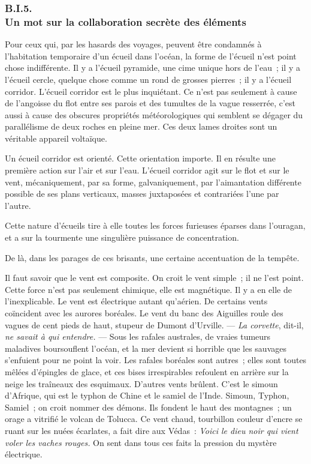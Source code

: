 \documentclass[french,twoside]{book} %
\begin{document}
 \subsubsection[{B.I.5. Un mot sur la collaboration secrète des éléments}]{B.I.5. \\
Un mot sur la collaboration secrète des éléments}
\noindent Pour ceux qui, par les hasards des voyages, peuvent être condamnés à l’habitation temporaire d’un écueil dans l’océan, la forme de l’écueil n’est point chose indifférente. Il y a l’écueil pyramide, une cime unique hors de l’eau ; il y a l’écueil cercle, quelque chose comme un rond de grosses pierres ; il y a l’écueil corridor. L’écueil corridor est le plus inquiétant. Ce n’est pas seulement à cause de l’angoisse du flot entre ses parois et des tumultes de la vague resserrée, c’est aussi à cause des obscures propriétés météorologiques qui semblent se dégager du parallélisme de deux roches en pleine mer. Ces deux lames droites sont un véritable appareil voltaïque.\par
Un écueil corridor est orienté. Cette orientation importe. Il en résulte une première action sur l’air et sur l’eau. L’écueil corridor agit sur le flot et sur le vent, mécaniquement, par sa forme, galvaniquement, par l’aimantation différente possible de ses plans  verticaux, masses juxtaposées et contrariées l’une par l’autre.\par
Cette nature d’écueils tire à elle toutes les forces furieuses éparses dans l’ouragan, et a sur la tourmente une singulière puissance de concentration.\par
De là, dans les parages de ces brisants, une certaine accentuation de la tempête.\par
Il faut savoir que le vent est composite. On croit le vent simple ; il ne l’est point. Cette force n’est pas seulement chimique, elle est magnétique. Il y a en elle de l’inexplicable. Le vent est électrique autant qu’aérien. De certains vents coïncident avec les aurores boréales. Le vent du banc des Aiguilles roule des vagues de cent pieds de haut, stupeur de Dumont d’Urville. — \emph{La corvette}, dit-il, \emph{ne savait à qui entendre.} — Sous les rafales australes, de vraies tumeurs maladives boursouflent l’océan, et la mer devient si horrible que les sauvages s’enfuient pour ne point la voir. Les rafales boréales sont autres ; elles sont toutes mêlées d’épingles de glace, et ces bises irrespirables refoulent en arrière sur la neige les traîneaux des esquimaux. D’autres vents brûlent. C’est le simoun d’Afrique, qui est le typhon de Chine et le samiel de l’Inde. Simoun, Typhon, Samiel ; on croit nommer des démons. Ils fondent le haut des montagnes ; un orage a vitrifié le volcan de Tolucca. Ce vent chaud, tourbillon couleur d’encre se ruant sur les nuées écarlates, a fait dire aux Védas : \emph{Voici le dieu noir qui vient voler les vaches rouges.} On sent dans tous ces faits la pression du mystère électrique.\par
\end{document}
